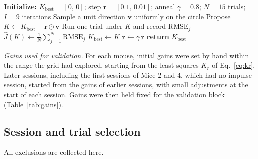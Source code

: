 \begin{algorithm}[h]
\caption{Zeroth-order controller gain search}
\label{alg:zo}
\begin{algorithmic}[1]
\State \textbf{Initialize:} $K_{\text{best}} = [0,\,0]$; step
       $\mathbf{r} = [0.1,\,0.01]$; anneal $\gamma = 0.8$; $N = 15$ trials;
       $I = 9$ iterations
    \State Sample a unit direction $\mathbf{v}$ uniformly on the circle
    \State Propose $K \leftarrow K_{\text{best}} + \mathbf{r}\odot\mathbf{v}$
        \State Run one trial under $K$ and record $\mathrm{RMSE}_j$
    \EndFor
    \State $\hat{J}(K) \leftarrow \frac{1}{N}\sum_{j=1}^{N}\mathrm{RMSE}_j$
        \State $K_{\text{best}} \leftarrow K$
    \EndIf
    \State $\mathbf{r} \leftarrow \gamma\,\mathbf{r}$
\EndFor
\State \textbf{return} $K_{\text{best}}$
\end{algorithmic}
\end{algorithm}

\emph{Gains used for validation.} For each mouse, initial gains were set by hand within the range the grid had explored, starting from the least-squares $K_r$ of Eq.~\eqref{eq:kr}.
Later sessions, including the first sessions of Mice 2 and 4, which had no impulse session, started from the gains of earlier sessions, with small adjustments at the start of each session.
Gains were then held fixed for the validation block (Table~\ref{tab:gains}).

\subsection*{Session and trial selection}

All exclusions are collected here.

